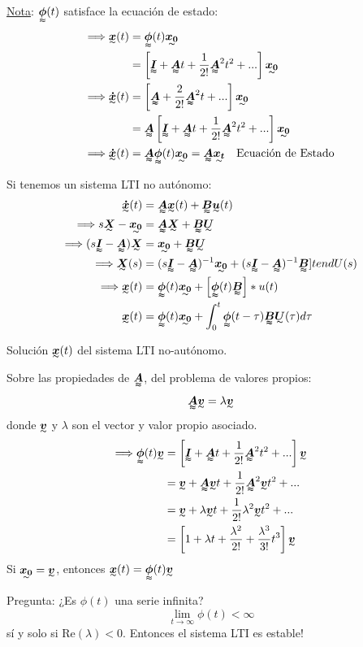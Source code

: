 \underline{Nota}: $\tenq{\phi}(t)$ satisface la ecuación de estado:
\begin{align*}
    \Longrightarrow \tend{x}(t) &= \tenq{\phi}(t)\tend{x_0}\\
    &= \left[\tenq{I}+\tenq{A}t+\frac{1}{2!}\tenq{A}^2t^2+...\right]\tend{x_0}\\
    \Longrightarrow \tend{\dot{x}}(t) &= \left[\tenq{A}+\frac{2}{2!}\tenq{A}^2t+...\right]\tend{x_0}\\
    &= \tenq{A}\left[\tenq{I}+\tenq{A}t+\frac{1}{2!}\tenq{A}^2t^2+...\right]\tend{x_0}\\
    \Longrightarrow \tend{\dot{x}}(t) &= \tenq{A}\tenq{\phi}(t)\tend{x_0}=\tenq{A}\tend{x_t} \quad \text{Ecuación de Estado}
\end{align*}

Si tenemos un sistema LTI no autónomo:
\begin{align*}
    \tend{\dot{x}}(t) &= \tenq{A}\tend{x}(t)+\tenq{B}\tend{u}(t)\\
    \Longrightarrow s\tend{X}-\tend{x_0} &= \tenq{A}\tend{X}+\tenq{B}\tend{U}\\
    \Longrightarrow (s\tenq{I}-\tenq{A})\tend{X} &= \tend{x_0}+\tenq{B}\tend{U}\\
    \Longrightarrow \tend{X}(s) &= (s\tenq{I}-\tenq{A})^{-1} \tend{x_0}+(s\tenq{I}-\tenq{A})^{-1} \tenq{B}]tend{U}(s)\\
    \Longrightarrow \tend{x}(t) &= \tenq{\phi}(t)\tend{x_0}+\left[ \tenq{\phi}(t)\tenq{B} \right] \ast u(t)\\
    \tend{x}(t) &= \tenq{\phi}(t)\tend{x_0}+\int_0^t\tenq{\phi}(t-\tau)\tenq{B}\tend{U}(\tau)d\tau
\end{align*}

Solución $\tend{x}(t)$ del sistema LTI no-autónomo.\\
\par Sobre las propiedades de $\tenq{A}$, del problema de valores propios:
$$\tenq{A}\tend{v}=\lambda\tend{v}$$
donde $\tend{v}$ y $\lambda$ son el vector y valor propio asociado.
\begin{align*}
    \Longrightarrow \tenq{\phi}(t)\tend{v} &= \left[\tenq{I}+\tenq{A}t+\frac{1}{2!}\tenq{A}^2t^2+...\right]\tend{v}\\
    &= \tend{v}+\tenq{A}\tend{v}t+\frac{1}{2!}\tenq{A}^2\tend{v}t^2+... \\
    &= \tend{v}+\lambda\tend{v}t+\frac{1}{2!}\lambda^2\tend{v}t^2+... \\
    &= \left[ 1+\lambda t+\frac{\lambda^2}{2!}+\frac{\lambda^3}{3!}t^3\right]\tend{v}
\end{align*}
Si $\tend{x_0}=\tend{v}$, entonces $\tend{x}(t)=\tenq{\phi}(t)\tend{v}$\\
\par Pregunta: ¿Es $\phi(t)$ una serie infinita?\\
$$\lim_{t \to \infty} \phi(t)<\infty $$ sí y solo si $\text{Re}(\lambda)<0$. 
Entonces el sistema LTI es estable!\\

